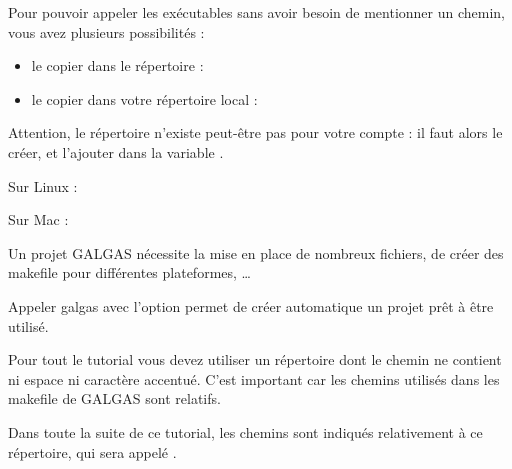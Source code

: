 

Pour pouvoir appeler les exécutables sans avoir besoin de mentionner un chemin, vous avez plusieurs possibilités :
\begin{itemize}
  \item le copier dans le répertoire  :  
  \item le copier dans votre répertoire local  : 
\end{itemize}

Attention, le répertoire  n'existe peut-être pas pour votre compte : il faut alors le créer, et l'ajouter dans la variable .

Sur Linux :
\begin{description}
  \item[ ] 
  \item[ ] 
\end{description}

Sur Mac :
\begin{description}
  \item[ ] 
  \item[ ] 
\end{description}














Un projet GALGAS nécessite la mise en place de nombreux fichiers, de créer des makefile pour différentes plateformes, … 

Appeler galgas avec l'option  permet de créer automatique un projet prêt à être utilisé.

Pour tout le tutorial vous devez utiliser un répertoire dont le chemin ne contient ni espace ni caractère accentué. C'est important car les chemins utilisés dans les makefile de GALGAS sont relatifs.

Dans toute la suite de ce tutorial, les chemins sont indiqués relativement à ce répertoire, qui sera appelé .

